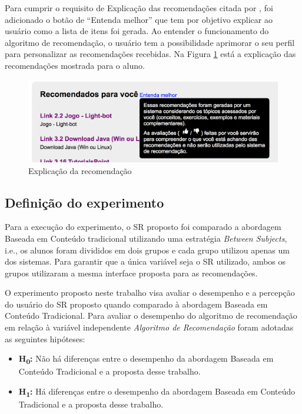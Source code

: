 Para cumprir o requisito de Explicação das recomendações citada por , foi adicionado o
botão de ``Entenda melhor'' que tem por objetivo explicar ao usuário como a lista de itens foi gerada. Ao entender o
funcionamento do algoritmo de recomendação, o usuário tem a possibilidade aprimorar o seu perfil para personalizar as
recomendações recebidas. Na Figura \ref{fig:adaptweb-proposta-explicacao} está a explicação das recomendações
mostrada para o aluno.

\begin{figure}[htb]
  \caption{\label{fig:adaptweb-proposta-explicacao}Explicação da recomendação}
  \begin{center}
      \includegraphics[scale=0.6]{./Figuras/explicacao-das-recomendacoes.png}
  \end{center}
\end{figure}

\subsection{Definição do experimento}\label{subsection:definicao-experimento}

Para a execução do experimento, o SR proposto foi comparado a abordagem Baseada em Conteúdo tradicional utilizando uma
estratégia \textit{Between Subjects}, i.e., os alunos foram divididos em dois grupos e cada grupo utilizou apenas
um dos sistemas. Para garantir que a única variável seja o SR utilizado, ambos os grupos utilizaram a mesma
interface proposta para as recomendações.

O experimento proposto neste trabalho visa avaliar o desempenho e a percepção do usuário do SR proposto quando
comparado à abordagem Baseada em Conteúdo Tradicional. Para avaliar o desempenho do algoritmo de recomendação em relação
à variável independente \textit{Algoritmo de Recomendação} foram adotadas as seguintes hipóteses:

\begin{itemize}
\item \textbf{H\textsubscript{0}:} Não há diferenças entre o desempenho da abordagem Baseada em Conteúdo
Tradicional e a proposta desse trabalho.
\item \textbf{H\textsubscript{1}:} Há diferenças entre o desempenho da abordagem Baseada em Conteúdo
Tradicional e a proposta desse trabalho.
\end{itemize}

